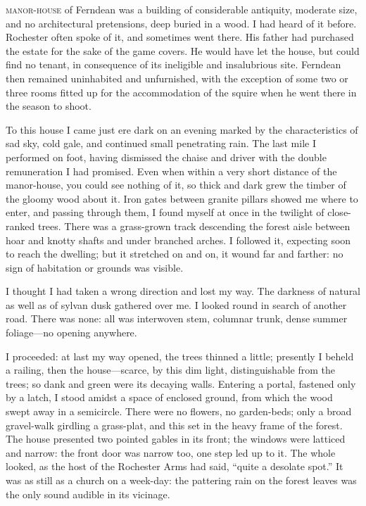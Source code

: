 
 \textsc{manor-house} of Ferndean was a building of considerable antiquity,
moderate size, and no architectural pretensions, deep buried in a wood. 
I had heard of it before. \Mr{} Rochester often spoke of it, and
sometimes went there. His father had purchased the estate for the sake
of the game covers. He would have let the house, but could find no
tenant, in consequence of its ineligible and insalubrious site. 
Ferndean then remained uninhabited and unfurnished, with the exception
of some two or three rooms fitted up for the accommodation of the squire
when he went there in the season to shoot.

To this house I came just ere dark on an evening marked by the
characteristics of sad sky, cold gale, and continued small penetrating
rain. The last mile I performed on foot, having dismissed the chaise
and driver with the double remuneration I had promised. Even when
within a very short distance of the manor-house, you could see nothing
of it, so thick and dark grew the timber of the gloomy wood about it. 
Iron gates between granite pillars showed me where to enter, and passing
through them, I found myself at once in the twilight of close-ranked
trees. There was a grass-grown track descending the forest aisle
between hoar and knotty shafts and under branched arches. I followed
it, expecting soon to reach the dwelling; but it stretched on and on, it
wound far and farther: no sign of habitation or grounds was visible.

I thought I had taken a wrong direction and lost my way. The darkness
of natural as well as of sylvan dusk gathered over me. I looked round
in search of another road. There was none: all was interwoven stem,
columnar trunk, dense summer foliage---no opening anywhere.

I proceeded: at last my way opened, the trees thinned a little;
presently I beheld a railing, then the house---scarce, by this dim
light, distinguishable from the trees; so dank and green were its
decaying walls. Entering a portal, fastened only by a latch, I stood
amidst a space of enclosed ground, from which the wood swept away in a
semicircle. There were no flowers, no garden-beds; only a broad
gravel-walk girdling a grass-plat, and this set in the heavy frame of
the forest. The house presented two pointed gables in its front; the
windows were latticed and narrow: the front door was narrow too, one
step led up to it. The whole looked, as the host of the Rochester Arms
had said, \enquote{quite a desolate spot.} It was as still as a church
on a week-day: the pattering rain on the forest leaves was the only
sound audible in its vicinage.

